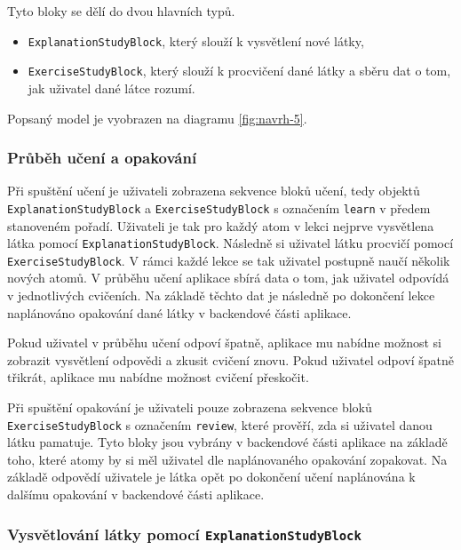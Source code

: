 Tyto bloky se dělí do dvou hlavních typů.

\begin{itemize}
    \item \texttt{ExplanationStudyBlock}, který slouží k vysvětlení nové látky,
    \item \texttt{ExerciseStudyBlock}, který slouží k procvičení dané látky a sběru dat o tom, jak uživatel dané látce rozumí.
\end{itemize}

Popsaný model je vyobrazen na diagramu \ref{fig:navrh-5}. 

\subsubsection{Průběh učení a opakování}

Při spuštění učení je uživateli zobrazena sekvence bloků učení, tedy objektů \texttt{ExplanationStudyBlock} a \texttt{ExerciseStudyBlock} s označením \texttt{learn} v předem stanoveném pořadí. Uživateli je tak pro každý atom v lekci nejprve vysvětlena látka pomocí \texttt{ExplanationStudyBlock}. Následně si uživatel látku procvičí pomocí \texttt{ExerciseStudyBlock}. V rámci každé lekce se tak uživatel postupně naučí několik nových atomů. V průběhu učení aplikace sbírá data o tom, jak uživatel odpovídá v jednotlivých cvičeních. Na základě těchto dat je následně po dokončení lekce naplánováno opakování dané látky v backendové části aplikace.

Pokud uživatel v průběhu učení odpoví špatně, aplikace mu nabídne možnost si zobrazit vysvětlení odpovědi a zkusit cvičení znovu. Pokud uživatel odpoví špatně třikrát, aplikace mu nabídne možnost cvičení přeskočit.

Při spuštění opakování je uživateli pouze zobrazena sekvence bloků \texttt{ExerciseStudyBlock} s označením \texttt{review}, které prověří, zda si uživatel danou látku pamatuje. Tyto bloky jsou vybrány v backendové části aplikace na základě toho, které atomy by si měl uživatel dle naplánovaného opakování zopakovat. Na základě odpovědí uživatele je látka opět po dokončení učení naplánována k dalšímu opakování v backendové části aplikace.

\subsubsection{Vysvětlování látky pomocí \texttt{ExplanationStudyBlock}}

